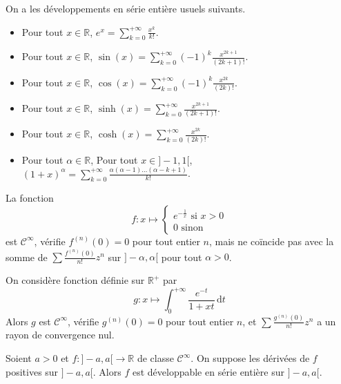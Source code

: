   \begin{example}
    On a les développements en série entière usuels suivants.
    \begin{itemize}
      \item Pour tout $x \in \mathbb{R}$, $e^x = \sum_{k=0}^{+\infty} \frac{x^k}{k!}$.
      \item Pour tout $x \in \mathbb{R}$, $\sin(x) = \sum_{k=0}^{+\infty} (-1)^{k} \frac{x^{2k+1}}{(2k+1)!}$.
      \item Pour tout $x \in \mathbb{R}$, $\cos(x) = \sum_{k=0}^{+\infty} (-1)^{k} \frac{x^{2k}}{(2k)!}$.
      \item Pour tout $x \in \mathbb{R}$, $\sinh(x) = \sum_{k=0}^{+\infty} \frac{x^{2k+1}}{(2k+1)!}$.
      \item Pour tout $x \in \mathbb{R}$, $\cosh(x) = \sum_{k=0}^{+\infty} \frac{x^{2k}}{(2k)!}$.
      \item Pour tout $\alpha \in \mathbb{R}$, Pour tout $x \in ]-1,1[$, $(1+x)^\alpha = \sum_{k=0}^{+\infty} \frac{\alpha(\alpha - 1) \dots (\alpha -k+1)}{k!}$.
    \end{itemize}
  \end{example}

  \begin{cexample}
    La fonction
    \[
    f : x \mapsto \begin{cases}
      e^{-\frac{1}{x}} \text{ si } x > 0 \\
      0 \text{ sinon}
    \end{cases}
    \]
    est $\mathcal{C}^\infty$, vérifie $f^{(n)}(0) = 0$ pour tout entier $n$, mais ne coïncide pas avec la somme de $\sum \frac{f^{(n)}(0)}{n!} z^n$ sur $]-\alpha,\alpha[$ pour tout $\alpha > 0$.
  \end{cexample}

  \begin{cexample}
    On considère fonction définie sur $\mathbb{R}^+$ par
    \[ g : x \mapsto \int_0^{+\infty} \frac{e^{-t}}{1+xt} \, \mathrm{d}t \]
    Alors $g$ est $\mathcal{C}^\infty$, vérifie $g^{(n)}(0) = 0$ pour tout entier $n$, et $\sum \frac{g^{(n)}(0)}{n!} z^n$ a un rayon de convergence nul.
  \end{cexample}


  \begin{theorem}[Bernstein]
    Soient $a > 0$ et $f : ]-a,a[ \rightarrow \mathbb{R}$ de classe $\mathcal{C}^\infty$. On suppose les dérivées de $f$ positives sur $]-a,a[$. Alors $f$ est développable en série entière sur $]-a,a[$.
  \end{theorem}

